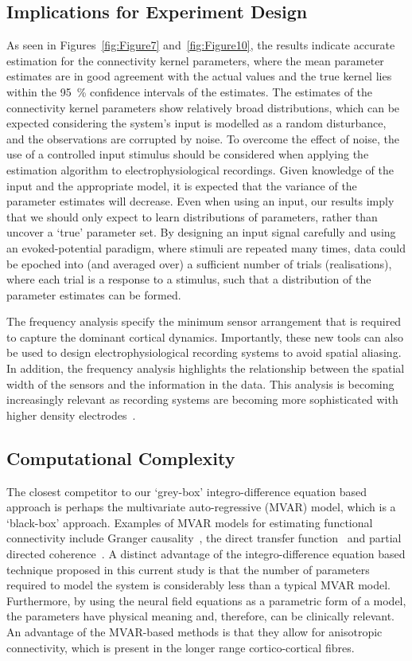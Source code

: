 \documentclass[12pt]{iopart}
\begin{document}
\subsection{Implications for Experiment Design}
As seen in Figures~\ref{fig:Figure7} and~\ref{fig:Figure10}, the results indicate accurate estimation for the connectivity kernel parameters, where the mean parameter estimates are in good agreement with the actual values and the true kernel lies within the 95~\% confidence intervals of the estimates. The estimates of the connectivity kernel parameters show relatively broad distributions, which can be expected considering the system's input is modelled as a random disturbance, and the observations are corrupted by noise. To overcome the effect of noise, the use of a controlled input stimulus should be considered when applying the estimation algorithm to electrophysiological recordings. Given knowledge of the input and the appropriate model, it is expected that the variance of the parameter estimates will decrease. Even when using an input, our results imply that we should only expect to learn distributions of parameters, rather than uncover a `true' parameter set. By designing an input signal carefully and using an evoked-potential paradigm, where stimuli are repeated many times, data could be epoched into (and averaged over) a sufficient number of trials (realisations), where each trial is a response to a stimulus, such that a distribution of the parameter estimates can be formed.

The frequency analysis specify the minimum sensor arrangement that is required to capture the dominant cortical dynamics. Importantly, these new tools can also be used to design electrophysiological recording systems to avoid spatial aliasing. In addition, the frequency analysis highlights the relationship between the spatial width of the sensors and the information in the data. This analysis is becoming increasingly relevant as recording systems are becoming more sophisticated with higher density electrodes~\cite{Brinkmann2009}.

\subsection{Computational Complexity}
The closest competitor to our `grey-box' integro-difference equation based approach is perhaps the multivariate auto-regressive (MVAR) model, which is a `black-box' approach. Examples of MVAR models for estimating functional connectivity include Granger causality~\cite{Hesse2003}, the direct transfer function~\cite{Kaminski1991} and partial directed coherence~\cite{Sameshima1999}. A distinct advantage of the integro-difference equation based technique proposed in this current study is that the number of parameters required to model the system is considerably less than a typical MVAR model. Furthermore, by using the neural field equations as a parametric form of a model, the parameters have physical meaning and, therefore, can be clinically relevant. An advantage of the MVAR-based methods is that they allow for anisotropic connectivity, which is present in the longer range cortico-cortical fibres. 
\end{document}
